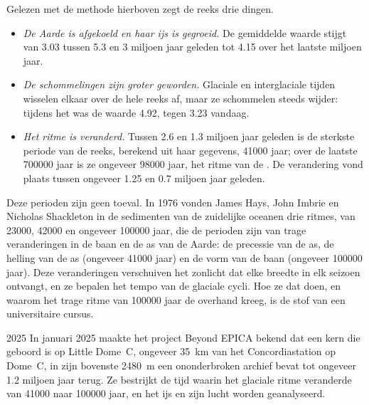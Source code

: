Gelezen met de methode hierboven zegt de reeks drie dingen.
\begin{itemize}
  \item \emph{De Aarde is afgekoeld en haar ijs is gegroeid.} De gemiddelde waarde
        stijgt van \qty{3.03}{\permil} tussen 5.3 en 3 miljoen jaar
        geleden tot \qty{4.15}{\permil} over het laatste miljoen jaar.
  \item \emph{De schommelingen zijn groter geworden.} Glaciale en interglaciale tijden
        wisselen elkaar over de hele reeks af, maar ze schommelen steeds wijder: tijdens
        het  was de waarde \qty{4.92}{\permil}, tegen
        \qty{3.23}{\permil} vandaag.
  \item \emph{Het ritme is veranderd.} Tussen 2.6 en 1.3 miljoen jaar
        geleden is de sterkste periode van de reeks, berekend uit haar gegevens,
        \num{41000} jaar; over de laatste \num{700000} jaar is ze ongeveer
        \num{98000} jaar, het ritme van de . De verandering vond
        plaats tussen ongeveer 1.25 en 0.7 miljoen jaar geleden.
\end{itemize}

Deze perioden zijn geen toeval. In 1976 vonden James Hays, John Imbrie en Nicholas
Shackleton in de sedimenten van de zuidelijke oceanen drie ritmes, van
\num{23000}, \num{42000} en ongeveer \num{100000} jaar, die de perioden zijn
van trage veranderingen in de baan en de as van de Aarde: de precessie van de as,
de helling van de as (ongeveer \num{41000} jaar) en de vorm van de baan
(ongeveer \num{100000} jaar). Deze veranderingen verschuiven het zonlicht dat elke
breedte in elk seizoen ontvangt, en ze bepalen het tempo van de glaciale
cycli. Hoe ze dat doen, en waarom het trage ritme van \num{100000} jaar de overhand
kreeg, is de stof van een universitaire cursus.

\begin{dated}{2025}
In januari 2025 maakte het project Beyond EPICA bekend dat een kern die geboord is op
Little Dome~C, ongeveer \qty{35}{km} van het Concordiastation op Dome~C, in zijn bovenste
\qty{2480}{m} een ononderbroken archief bevat tot ongeveer 1.2 miljoen jaar
terug. Ze bestrijkt de tijd
waarin het glaciale ritme veranderde van \num{41000} naar \num{100000} jaar, en het
ijs en zijn lucht worden geanalyseerd.
\end{dated}

